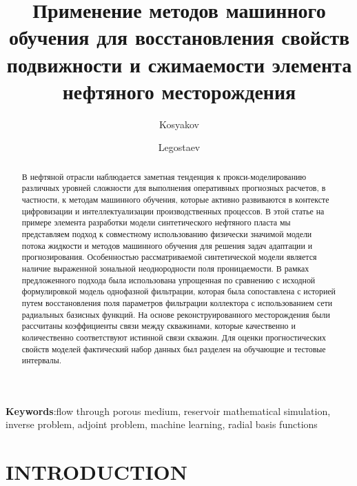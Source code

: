 \documentclass{article}
\begin{document}
\title{Применение методов машинного обучения для восстановления свойств подвижности и сжимаемости элемента нефтяного месторождения} %
\author{Kosyakov} %
\author{Legostaev}




\begin{abstract} %
В нефтяной отрасли наблюдается заметная тенденция к прокси-моделированию различных уровней сложности для выполнения оперативных прогнозных расчетов, в частности, к методам машинного обучения, которые активно развиваются в контексте цифровизации и интеллектуализации производственных процессов. В этой статье на примере элемента разработки модели синтетического нефтяного пласта мы представляем подход к совместному использованию физически значимой модели потока жидкости и методов машинного обучения для решения задач адаптации и прогнозирования. Особенностью рассматриваемой синтетической модели является наличие выраженной зональной неоднородности поля проницаемости. В рамках предложенного подхода была использована упрощенная по сравнению с исходной формулировкой модель однофазной фильтрации, которая была сопоставлена с историей путем восстановления поля параметров фильтрации коллектора с использованием сети радиальных базисных функций. На основе реконструированного месторождения были рассчитаны коэффициенты связи между скважинами, которые качественно и количественно соответствуют истинной связи скважин. Для оценки прогностических свойств моделей фактический набор данных был разделен на обучающие и тестовые интервалы.
\end{abstract}

\textbf{Keywords}:flow through porous medium, reservoir mathematical simulation, inverse problem, adjoint problem, machine learning, radial basis functions%

\maketitle

\section{INTRODUCTION}
\end{document}
